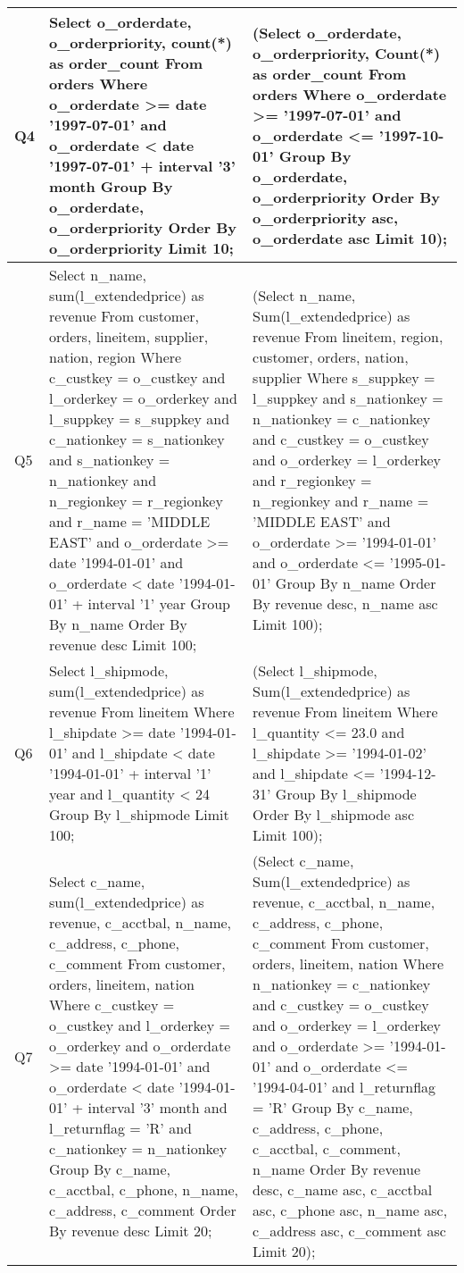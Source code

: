 {\begin{longtable}{|p{0.5cm}|p{7cm}|p{7cm}|}
Q4&
Select o\_orderdate, o\_orderpriority, count(*) as order\_count From orders Where o\_orderdate >= date '1997-07-01' and o\_orderdate < date '1997-07-01' + interval '3' month Group By o\_orderdate, o\_orderpriority Order By o\_orderpriority Limit 10;&
(Select o\_orderdate, o\_orderpriority, Count(*) as order\_count From orders Where o\_orderdate  >= '1997-07-01' and o\_orderdate <= '1997-10-01' Group By o\_orderdate, o\_orderpriority Order By o\_orderpriority asc, o\_orderdate asc Limit 10);\\\hline
Q5&
Select  n\_name, sum(l\_extendedprice) as revenue From  customer, orders, lineitem, supplier, nation, region Where  c\_custkey = o\_custkey and l\_orderkey = o\_orderkey and l\_suppkey = s\_suppkey and c\_nationkey = s\_nationkey and s\_nationkey = n\_nationkey and n\_regionkey = r\_regionkey and r\_name = 'MIDDLE EAST' and o\_orderdate >= date '1994-01-01' and o\_orderdate < date '1994-01-01' + interval '1' year Group By n\_name Order By  revenue desc Limit  100;&
(Select n\_name, Sum(l\_extendedprice) as revenue From lineitem, region, customer, orders, nation, supplier Where s\_suppkey = l\_suppkey and s\_nationkey = n\_nationkey = c\_nationkey and c\_custkey = o\_custkey and o\_orderkey = l\_orderkey and r\_regionkey = n\_regionkey and r\_name  = 'MIDDLE EAST' and o\_orderdate  >= '1994-01-01' and o\_orderdate <= '1995-01-01' Group By n\_name Order By revenue desc, n\_name asc Limit 100);\\\hline
Q6&
Select  l\_shipmode, sum(l\_extendedprice) as revenue From  lineitem Where  l\_shipdate >= date '1994-01-01' and l\_shipdate < date '1994-01-01' + interval '1' year and l\_quantity < 24 Group By  l\_shipmode Limit  100;&
(Select l\_shipmode, Sum(l\_extendedprice) as revenue From lineitem Where l\_quantity  <= 23.0 and l\_shipdate  >= '1994-01-02' and l\_shipdate <= '1994-12-31' Group By l\_shipmode Order By l\_shipmode asc Limit 100);\\\hline
Q7&
Select  c\_name, sum(l\_extendedprice) as revenue, c\_acctbal, n\_name, c\_address, c\_phone, c\_comment From  customer, orders, lineitem, nation Where  c\_custkey = o\_custkey and l\_orderkey = o\_orderkey and o\_orderdate >= date '1994-01-01' and o\_orderdate < date '1994-01-01' + interval '3' month and l\_returnflag = 'R' and c\_nationkey = n\_nationkey Group By  c\_name, c\_acctbal, c\_phone, n\_name, c\_address, c\_comment Order By  revenue desc Limit  20;&
(Select c\_name, Sum(l\_extendedprice) as revenue, c\_acctbal, n\_name, c\_address, c\_phone, c\_comment From customer, orders, lineitem, nation Where n\_nationkey = c\_nationkey and c\_custkey = o\_custkey and o\_orderkey = l\_orderkey and o\_orderdate  >= '1994-01-01' and o\_orderdate <= '1994-04-01' and l\_returnflag  = 'R' Group By c\_name, c\_address, c\_phone, c\_acctbal, c\_comment, n\_name Order By revenue desc, c\_name asc, c\_acctbal asc, c\_phone asc, n\_name asc, c\_address asc, c\_comment asc Limit 20);\\\hline

\end{longtable}}
